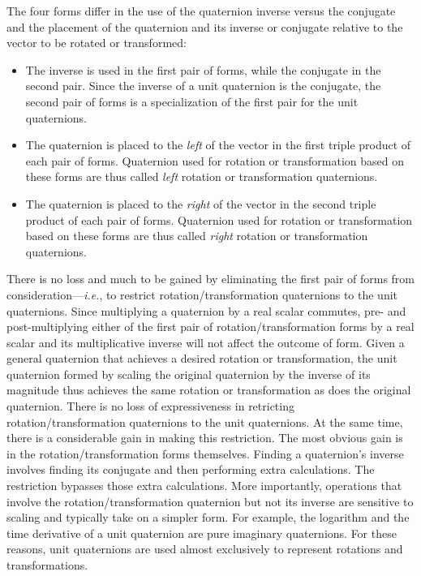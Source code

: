 The four forms differ in the use of the quaternion inverse versus the conjugate
and the placement of the quaternion and its inverse or conjugate relative
to the vector to be rotated or transformed:
\begin{itemize}
\item The inverse is used in the first pair of forms,
while the conjugate in the second pair.
Since the inverse of a unit quaternion is the conjugate,
the second pair of forms is
a specialization of the first pair for the unit quaternions.
\item The quaternion is placed to the \emph{left}
of the vector in the first triple product of each pair of forms.
Quaternion used for rotation or transformation based on these forms
are thus called \emph{left} rotation or transformation quaternions.
\item The quaternion is placed to the \emph{right}
of the vector in the second triple product of each pair of forms.
Quaternion used for rotation or transformation based on these forms
are thus called \emph{right} rotation or transformation quaternions.

\end{itemize}

There is no loss and much to be gained by eliminating the first pair of forms
from consideration---\emph{i.e.}, to restrict rotation/transformation
quaternions to the unit quaternions.
Since multiplying a quaternion by a real scalar commutes,
pre- and post-multiplying either of the first pair of rotation/transformation
forms by a real scalar
and its multiplicative inverse will not affect the outcome of form.
Given a general quaternion that achieves a desired rotation or transformation,
the unit quaternion formed by scaling the original quaternion by the inverse of
its magnitude thus achieves the same rotation or transformation
as does the original quaternion. There is no loss of expressiveness in
retricting rotation/transformation quaternions to the unit quaternions.
At the same time, there is a considerable gain
in making this restriction.
The most obvious gain is in the rotation/transformation
forms themselves. Finding a quaternion's inverse involves finding its conjugate
and then performing extra calculations. The restriction bypasses those extra
calculations.
More importantly, operations that involve the rotation/transformation quaternion
but not its inverse are sensitive to scaling and typically take on a simpler
form. For example, the logarithm and the time derivative of a unit quaternion
are pure imaginary quaternions. For these reasons, unit quaternions
are used almost exclusively to represent rotations and transformations.

